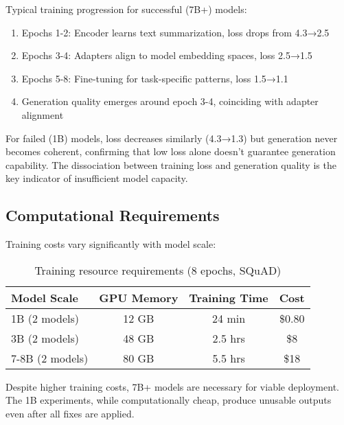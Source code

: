 \documentclass{article}
\begin{document}
Typical training progression for successful (7B+) models:
\begin{enumerate}
\item Epochs 1-2: Encoder learns text summarization, loss drops from 4.3→2.5
\item Epochs 3-4: Adapters align to model embedding spaces, loss 2.5→1.5
\item Epochs 5-8: Fine-tuning for task-specific patterns, loss 1.5→1.1
\item Generation quality emerges around epoch 3-4, coinciding with adapter alignment
\end{enumerate}

For failed (1B) models, loss decreases similarly (4.3→1.3) but generation never becomes coherent, confirming that low loss alone doesn't guarantee generation capability. The dissociation between training loss and generation quality is the key indicator of insufficient model capacity.

\subsection{Computational Requirements}

Training costs vary significantly with model scale:

\begin{table}[h]
\caption{Training resource requirements (8 epochs, SQuAD)}
\vskip 0.15in
\begin{center}
\begin{small}
\begin{tabular}{lccc}
\toprule
Model Scale & GPU Memory & Training Time & Cost \\
\midrule
1B (2 models) & 12 GB & 24 min & \$0.80 \\
3B (2 models) & 48 GB & 2.5 hrs & \$8 \\
7-8B (2 models) & 80 GB & 5.5 hrs & \$18 \\
\bottomrule
\end{tabular}
\end{small}
\end{center}
\end{table}

Despite higher training costs, 7B+ models are necessary for viable deployment. The 1B experiments, while computationally cheap, produce unusable outputs even after all fixes are applied.
\end{document}
